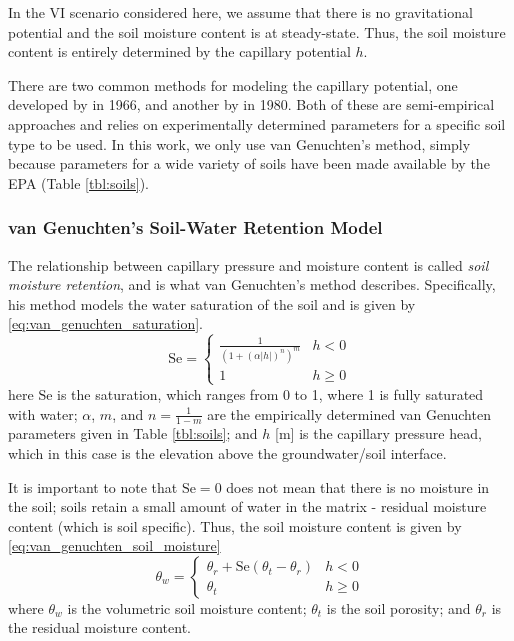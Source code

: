 In the VI scenario considered here, we assume that there is no gravitational potential and the soil moisture content is at steady-state.
Thus, the soil moisture content is entirely determined by the capillary potential $h$.\par

There are two common methods for modeling the capillary potential, one developed by \citeauthor{brooks_properties_1966}\cite{brooks_properties_1966} in 1966, and another by \citeauthor{van_genuchten_closed-form_1980}\cite{van_genuchten_closed-form_1980} in 1980.
Both of these are semi-empirical approaches and relies on experimentally determined parameters for a specific soil type to be used.
In this work, we only use van Genuchten's method, simply because parameters for a wide variety of soils have been made available by the EPA (Table \ref{tbl:soils}).\par

\subsubsection{van Genuchten's Soil-Water Retention Model}

The relationship between capillary pressure and moisture content is called \textit{soil moisture retention}, and is what van Genuchten's method describes.
Specifically, his method models the water saturation of the soil and is given by \eqref{eq:van_genuchten_saturation}.
\begin{equation}\label{eq:van_genuchten_saturation}
  \mathrm{Se} =
    \begin{cases}
      \frac{1}{(1 + (\alpha |h|)^n)^m} & h < 0 \\
    1 & h \geq 0
    \end{cases}
\end{equation}
here $\mathrm{Se}$ is the saturation, which ranges from 0 to 1, where 1 is fully saturated with water;
$\alpha$, $m$, and $n=\frac{1}{1-m}$ are the empirically determined van Genuchten parameters given in Table \ref{tbl:soils};
and $h$ [\si{\metre}] is the capillary pressure head, which in this case is the elevation above the groundwater/soil interface.\par

It is important to note that $\mathrm{Se} = 0$ does not mean that there is no moisture in the soil; soils retain a small amount of water in the matrix - residual moisture content (which is soil specific).
Thus, the soil moisture content is given by \eqref{eq:van_genuchten_soil_moisture}
\begin{equation}\label{eq:van_genuchten_soil_moisture}
  \theta_w =
    \begin{cases}
      \theta_r + \mathrm{Se}(\theta_t - \theta_r) & h < 0 \\
      \theta_t & h \geq 0
    \end{cases}
\end{equation}
where $\theta_w$ is the volumetric soil moisture content;
$\theta_t$ is the soil porosity;
and $\theta_r$ is the residual moisture content.\par

